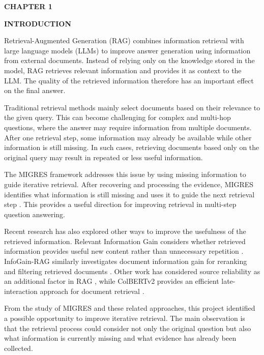 \documentclass[12pt,a4paper]{report}
\newcommand{\chaptertitle}[2]{
    \begin{center}
        {\fontsize{18}{21}\selectfont\bfseries CHAPTER #1\par}
        \vspace{0.10in}
        {\fontsize{18}{21}\selectfont\bfseries #2\par}
    \end{center}
    \vspace{0.12in}
}
\begin{document}
\setcounter{page}{1}

\chaptertitle{1}{INTRODUCTION}

\justifying

Retrieval-Augmented Generation (RAG) combines information retrieval with large language models (LLMs) to improve answer generation using information from external documents. Instead of relying only on the knowledge stored in the model, RAG retrieves relevant information and provides it as context to the LLM. The quality of the retrieved information therefore has an important effect on the final answer.

Traditional retrieval methods mainly select documents based on their relevance to the given query. This can become challenging for complex and multi-hop questions, where the answer may require information from multiple documents. After one retrieval step, some information may already be available while other information is still missing. In such cases, retrieving documents based only on the original query may result in repeated or less useful information.

The MIGRES framework addresses this issue by using missing information to guide iterative retrieval. After recovering and processing the evidence, MIGRES identifies what information is still missing and uses it to guide the next retrieval step \cite{wang2025migres}. This provides a useful direction for improving retrieval in multi-step question answering.

Recent research has also explored other ways to improve the usefulness of the retrieved information. Relevant Information Gain considers whether retrieved information provides useful new content rather than unnecessary repetition \cite{pickett2024better}. InfoGain-RAG similarly investigates document information gain for reranking and filtering retrieved documents \cite{wang2025infogain}. Other work has considered source reliability as an additional factor in RAG \cite{hwang2025reliability}, while ColBERTv2 provides an efficient late-interaction approach for document retrieval \cite{santhanam2022colbertv2}.

From the study of MIGRES and these related approaches, this project identified a possible opportunity to improve iterative retrieval. The main observation is that the retrieval process could consider not only the original question but also what information is currently missing and what evidence has already been collected.
\end{document}
